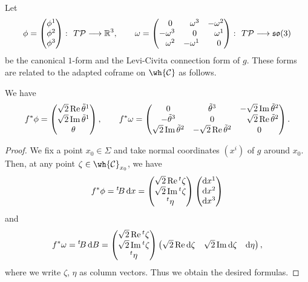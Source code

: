 Let
\[
\phi=\begin{pmatrix}
\phi^1 \\ \phi^2 \\ \phi^3
\end{pmatrix}
\colon\ T\mathcal{P}\longrightarrow \mathbb{R}^3, \qquad \omega=\begin{pmatrix}
\hphantom{-}0 & \hphantom{-}\omega^3 & -\omega^2 \\
-\omega^3 & \hphantom{-}0 & \hphantom{-}\omega^1 \\
\hphantom{-}\omega^2 & -\omega^1 & \hphantom{-}0
\end{pmatrix}
\colon\ T\mathcal{P}\longrightarrow \mathfrak{so}(3)
\]
be the canonical $1$-form and the Levi-Civita connection form of $g$.
These forms are related to the adapted coframe  on $\wh{\mathcal{C}}$ as follows.
\begin{Lemma}
We have
\[
f^*\phi=
\begin{pmatrix}
\sqrt{2}\operatorname{Re}\tilde\theta^1 \\
\sqrt{2}\operatorname{Im}\tilde\theta^1 \\
\theta
\end{pmatrix}, \qquad
f^*\omega=\begin{pmatrix}
0 & \tilde\theta^3 & -\sqrt{2}\operatorname{Im}\tilde\theta^2 \\
-\tilde\theta^3 & 0 & \hphantom{-}\sqrt{2}\operatorname{Re}\tilde\theta^2 \\
\sqrt{2}\operatorname{Im}\tilde\theta^2 & -\sqrt{2}\operatorname{Re}\tilde\theta^2& 0
\end{pmatrix}.
\]
\end{Lemma}
\begin{proof}
We fix a point $x_0\in\Sigma$ and take normal coordinates $(x^i)$ of $g$ around
$x_0$. Then, at any point $\zeta\in \wh{\mathcal{C}}_{x_0}$, we have
\[
f^*\phi={}^t \!B\, {\rm d}x =\begin{pmatrix}
\sqrt{2}\operatorname{Re}{}^t\zeta \\
\sqrt{2}\operatorname{Im}{}^t\zeta \\
{}^t\eta
\end{pmatrix}
\begin{pmatrix}
{\rm d}x^1 \\ {\rm d}x^2 \\ {\rm d}x^3
\end{pmatrix}
\]
and
\[
f^*\omega={}^t\!B\,{\rm d}B=
\begin{pmatrix}
\sqrt{2}\operatorname{Re}{}^t\zeta \\
\sqrt{2}\operatorname{Im}{}^t\zeta \\
{}^t\eta
\end{pmatrix}
\begin{pmatrix}
\sqrt{2}\operatorname{Re}{\rm d}\zeta & \sqrt{2}\operatorname{Im} {\rm d}\zeta & {\rm d}\eta
\end{pmatrix},
\]
where we write $\zeta$, $\eta$ as column vectors. Thus we obtain the desired formulas.
\end{proof}

